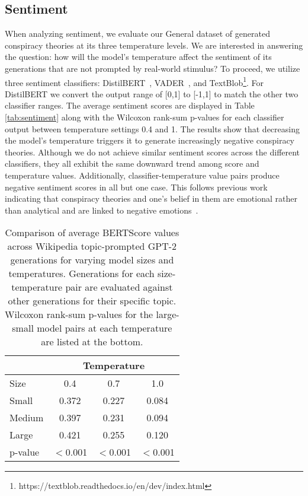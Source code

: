 \documentclass[11pt,a4paper]{article}
\begin{document}
\subsection{Sentiment}
When analyzing sentiment, we evaluate our General dataset of generated conspiracy theories at its three temperature levels. We are interested in answering the question: how will the model's temperature affect the sentiment of its generations that are not prompted by real-world stimulus? To proceed, we utilize three sentiment classifiers: DistilBERT~\cite{sanh2019distilbert}, VADER~\cite{gilbert2014vader}, and TextBlob\footnote{https://textblob.readthedocs.io/en/dev/index.html}. For DistilBERT we convert the output range of [0,1] to [-1,1] to match the other two classifier ranges. The average sentiment scores are displayed in Table \ref{tab:sentiment} along with the Wilcoxon rank-sum p-values for each classifier output between temperature settings 0.4 and 1. The results show that decreasing the model's temperature triggers it to generate increasingly negative conspiracy theories. Although we do not achieve similar sentiment scores across the different classifiers, they all exhibit the same downward trend among score and temperature values. Additionally, classifier-temperature value pairs produce negative sentiment scores in all but one case.  This follows previous work indicating that conspiracy theories and one's belief in them are emotional rather than analytical and are linked to negative emotions~\cite{van2018belief}. 


\begin{table}[t]
\centering
\begin{tabular}{l|*{3}{c}}
\toprule
&   \multicolumn{3}{c}{Temperature} \\
\hline
Size  & 0.4  & 0.7  & {1.0}   \\
\toprule
Small  & 0.372  & 0.227  & 0.084  \\
\hline
Medium  & 0.397  & 0.231  & 0.094   \\
\hline
Large  &  0.421  & 0.255 & 0.120   \\
\hline
\hline
p-value & $<$0.001 & $<$0.001 & $<$0.001 \\
\bottomrule
 \end{tabular}
\caption{Comparison of average BERTScore values across Wikipedia topic-prompted GPT-2 generations for varying model sizes and temperatures. Generations for each size-temperature pair are evaluated against other generations for their specific topic. Wilcoxon rank-sum p-values for the large-small model pairs at each temperature are listed at the bottom.}\label{tab:diversity}
\end{table}
\end{document}
